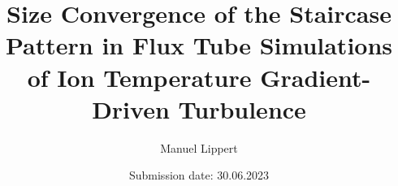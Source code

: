 \titlehead{
    \centering
    \texttt{[image: Uni\_Logo\_white\_black.png]}
}

\subject{\normalfont Bachelor Thesis}
\title{Size Convergence of the \boldmath{$\exb$} Staircase Pattern in Flux Tube Simulations of Ion Temperature Gradient-Driven Turbulence}
\author{Manuel Lippert}
\date{Submission date: 30.06.2023}
\publishers{\textbf{Physics Department at the University of Bayreuth}\\
\vspace*{2em}
Supervisors:\\
Prof.\,Arthur\,G.\,Peeters\\
Dr.\,Florian\,Rath
}